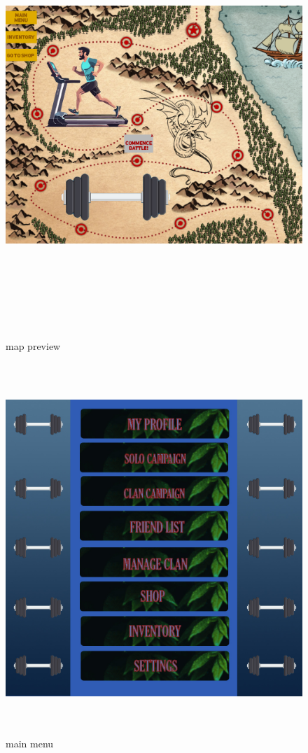 \begin{figure}[!htb]
  \centering
    \centering
    \includegraphics[width=\textwidth,height=16cm]{mockup2.jpg}
    \caption{map preview}
    \label{}
\end{figure}
\begin{figure}[!htb]
  \centering
    \centering
    \includegraphics[width=\textwidth,height=14cm]{mockup3.jpg}
    \caption{main menu}
    \label{}
\end{figure}
